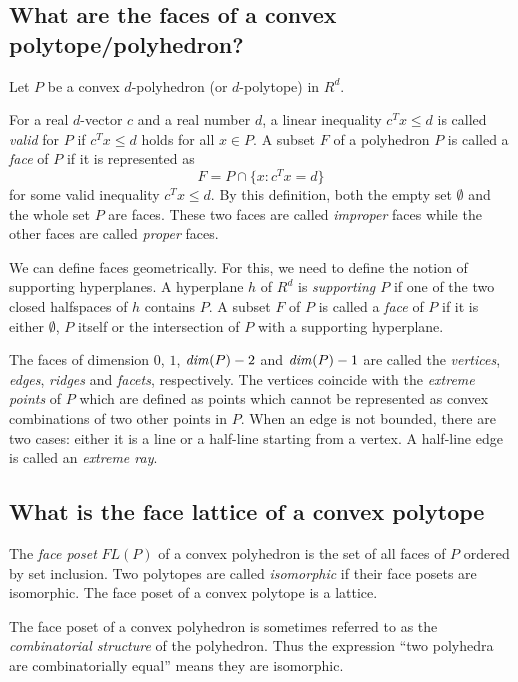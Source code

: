 \documentclass[[a4paper,12pt]{article}
\def\dim{\mathop{\it dim}\nolimits}
\begin{document}
\subsection{What are the faces of a convex polytope/polyhedron?} \label{polytope:faces}

Let $P$ be a convex $d$-polyhedron (or $d$-polytope) in $R^d$.

For a real $d$-vector $c$ and a real number $d$, a linear inequality 
$c^T x \le d$ 
is called {\em valid\/} for $P$ if $c^T x \le d$ holds for all $x \in P$.
A subset $F$ of a polyhedron $P$ is called a {\em face\/} of $P$ if it is
represented as
\[
   F= P \cap \{ x:  c^Tx = d \}
\]
for some valid inequality $c^T x \le d$.  By this definition,
both the empty set $\emptyset$ and the whole set $P$ are
faces.  These two faces are called {\em improper\/} faces while the other
faces are called {\em proper\/} faces.

We can define faces geometrically.  For this, we need to
define the notion of supporting hyperplanes. 
A hyperplane $h$ of $R^d$ is {\em supporting
$P$\/} if one of the two closed halfspaces of $h$ contains $P$.   
A subset $F$ of $P$ is called a {\em face\/} of $P$ 
if it is either $\emptyset$, $P$
itself or the intersection of $P$ with a supporting hyperplane.

The faces of dimension $0$, $1$, $\dim(P)-2$ and $\dim(P)-1$ are called the {\em vertices\/},
{\em edges\/}, {\em ridges\/} and {\em facets\/}, respectively.  
The vertices coincide
with the {\em extreme points\/} of $P$ which are defined as points which cannot
be represented as convex combinations of two other points in $P$.
When an edge is not bounded, there are two cases: either it is a line
or a half-line starting from a vertex.  
A half-line edge is called an {\em extreme ray\/}.

\subsection{What is the face lattice of a convex polytope}
\label{polytope:facelattice}

The {\em face poset\/} $FL(P)$ of a convex polyhedron is 
the set of all faces of $P$ ordered by set inclusion.
Two polytopes are called {\em isomorphic\/} if
their face posets are isomorphic.  
The face poset of a convex polytope is a lattice.

The face poset of a convex polyhedron is sometimes
referred to as the {\em combinatorial structure\/} of the polyhedron.
Thus the expression ``two polyhedra are combinatorially equal''
means they are isomorphic.
\end{document}
